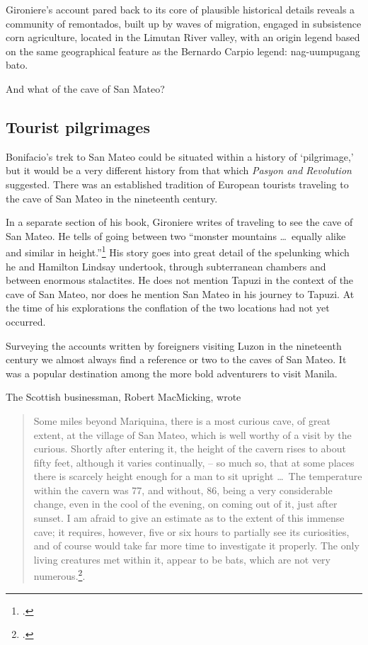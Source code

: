 Gironiere's account pared back to its core of plausible historical details reveals a community of remontados, built up by waves of migration, engaged in subsistence corn agriculture, located in the Limutan River valley, with an origin legend based on the same geographical feature as the Bernardo Carpio legend: nag-uumpugang bato.

And what of the cave of San Mateo? 

\subsection{Tourist pilgrimages}

Bonifacio's trek to San Mateo could be situated within a history of \enquote*{pilgrimage,} but it would be a very different history from that which \textit{Pasyon and Revolution} suggested. There was an established tradition of European tourists traveling to the cave of San Mateo in the nineteenth century.

In a separate section of his book, Gironiere writes of traveling to see the cave of San Mateo. He tells of going between two \enquote{monster mountains \ldots\ equally alike and similar in height.}\footcite[128]{Gironiere1962} His story goes into great detail of the spelunking which he and Hamilton Lindsay undertook, through subterranean chambers and between enormous stalactites. He does not mention Tapuzi in the context of the cave of San Mateo, nor does he mention San Mateo in his journey to Tapuzi. At the time of his explorations the conflation of the two locations had not yet occurred.

Surveying the accounts written by foreigners visiting Luzon in the nineteenth century we almost always find a reference or two to the caves of San Mateo. It was a popular destination among the more bold adventurers to visit Manila.

The Scottish businessman, Robert MacMicking, wrote

\begin{quote}
Some miles beyond Mariquina, there is a most curious cave, of great extent, at the village of San Mateo, which is well worthy of a visit by the curious. Shortly after entering it, the height of the cavern rises to about fifty feet, although it varies continually, -- so much so, that at some places there is scarcely height enough for a man to sit upright \ldots\ The temperature within the cavern was 77\degree, and without, 86\degree, being a very considerable change, even in the cool of the evening, on coming out of it, just after sunset. I am afraid to give an estimate as to the extent of this immense cave; it requires, however, five or six hours to partially see its curiosities, and of course would take far more time to investigate it properly. The only living creatures met within it,  appear to be bats, which are not very numerous.\footcite[107-8]{MacMicking1851}.
\end{quote}

